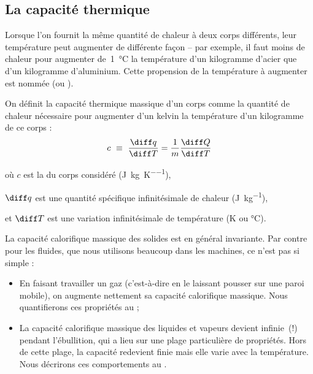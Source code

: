 	\subsection{La capacité thermique}
	\label{ch_capacite_thermique}

		Lorsque l’on fournit la même quantité de chaleur à deux corps différents, leur température peut augmenter de différente façon -- par exemple, il faut moins de chaleur pour augmenter de~\SI{1}{\degreeCelsius} la température d’un \si{kilogramme} d’acier que d’un \si{kilogramme} d’aluminium. Cette propension de la température à augmenter est nommée  (ou ).

		On définit la capacité thermique massique d’un corps comme la quantité de chaleur nécessaire pour augmenter d’un \si{kelvin} la température d’un \si{kilogramme} de ce corps :
		\begin{equation}
			c\ \equiv \ \frac{\diff q}{\diff T} = \frac{1}{m} \frac{\diff Q}{\diff T}
			\label{eq_def_capacité_calorifique_massique}
		\end{equation}
		\begin{equationterms}
			\item où \tab $c$			\tab\tab est la  du corps considéré (\si{\joule\per\kilogram\per\kelvin}),
			\item 	\tab $\diff q$ \tab est une quantité spécifique infinitésimale de chaleur (\si{\joule\per\kilogram}),
			\item et \tab $\diff T$ \tab est une variation infinitésimale de température (\si{\kelvin} ou \si{\degreeCelsius}).
		\end{equationterms}

		La capacité calorifique massique des solides est en général invariante. Par contre pour les fluides, que nous utilisons beaucoup dans les machines, ce n’est pas si simple :

		\begin{itemize}

			\item En faisant travailler un gaz (c’est-à-dire en le laissant pousser sur une paroi mobile), on augmente nettement sa capacité calorifique massique. Nous quantifierons ces propriétés au \coursquatre ;

			\item La capacité calorifique massique des liquides et vapeurs devient infinie~(!) pendant l’ébullition, qui a lieu sur une plage particulière de propriétés. Hors de cette plage, la capacité redevient finie mais elle varie avec la température. Nous décrirons ces comportements au \courscinq.

		\end{itemize}

